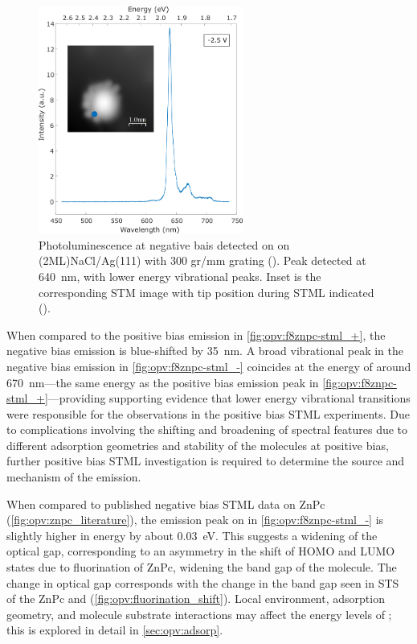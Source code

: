 \begin{figure} [H]
    \centering
           \includegraphics[width=0.6\textwidth]{pictures/f8znpc_-ve_emission_inset300.png}
        \caption{Photoluminescence at negative bais detected on  on (2ML)NaCl/Ag(111) with 300 gr/mm grating (). Peak detected at \SI{640}{nm}, with lower energy vibrational peaks. Inset is the corresponding STM image with tip position during STML indicated ().}
        \label{fig:opv:f8znpc-stml_-}
\end{figure}

When compared to the positive bias emission in \autoref{fig:opv:f8znpc-stml_+}, the negative bias emission is blue-shifted by \SI{35}{nm}. A broad vibrational peak in the negative bias emission in \autoref{fig:opv:f8znpc-stml_-} coincides at the energy of around \SI{670}{nm}---the same energy as the positive bias emission peak in \autoref{fig:opv:f8znpc-stml_+}---providing supporting evidence that lower energy vibrational transitions were responsible for the observations in the positive bias \ac{STML} experiments.  Due to complications involving the shifting and broadening of spectral features due to different adsorption geometries and stability of the molecules at positive bias, further positive bias \ac{STML} investigation is required to determine the source and mechanism of the emission.

When compared to published negative bias \ac{STML} data on \ac{ZnPc} (\autoref{fig:opv:znpc_literature}), the emission peak on  in \autoref{fig:opv:f8znpc-stml_-} is slightly higher in energy by about \SI{0.03}{eV}. This suggests a widening of the optical gap, corresponding to an asymmetry in the shift of HOMO and LUMO states due to fluorination of ZnPc, widening the band gap of the molecule. The change in optical gap corresponds with the change in the band gap seen in \ac{STS} of the ZnPc and  (\autoref{fig:opv:fluorination_shift}).  Local environment, adsorption geometry, and molecule substrate interactions may affect the energy levels of ; this is explored in detail in \autoref{sec:opv:adsorp}.

